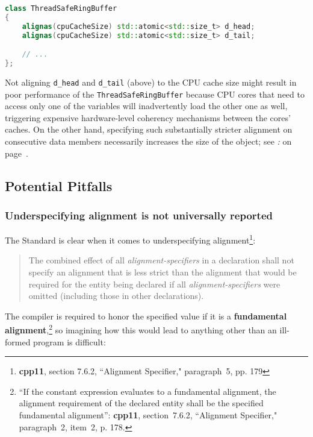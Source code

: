 \begin{lstlisting}[language=C++]
class ThreadSafeRingBuffer
{
    alignas(cpuCacheSize) std::atomic<std::size_t> d_head;
    alignas(cpuCacheSize) std::atomic<std::size_t> d_tail;

    // ...
};
\end{lstlisting}

\noindent Not aligning \texttt{d\_head} and \texttt{d\_tail} (above) to the CPU
cache size might result in poor performance of the
\texttt{ThreadSafeRingBuffer} because CPU cores that need to access only one
of the variables will inadvertently load the other one as well,
triggering expensive hardware-level coherency mechanisms between the
cores' caches. On the other hand, specifying such substantially stricter
alignment on consecutive data members necessarily increases the size of
the object; see {\it{}:} {\it{}} on page~\pageref{stricter-alignment-might-reduce-cache-utilization}.

\subsection[Potential Pitfalls]{Potential Pitfalls}\label{potential-pitfalls}

\subsubsection[Underspecifying alignment is not universally reported]{Underspecifying alignment is not universally reported}\label{underspecifying-alignment-is-not-universally-reported}

The Standard is clear when it comes to underspecifying
alignment{\cprotect\footnote{\textbf{{cpp11}}, section 7.6.2, ``Alignment Specifier," paragraph~5, pp. 179}}:
\begin{quote}
The combined effect of all \textit{alignment-specifiers} in a declaration
shall not specify an alignment that is less strict than the alignment
that would be required for the entity being declared if all
\textit{alignment-specifiers} were omitted (including those in other
declarations).
\end{quote}
The compiler is required to honor the
specified value if it is a \textbf{fundamental
alignment},{\cprotect\footnote{``If the constant expression evaluates to
a fundamental alignment, the alignment requirement of the declared
entity shall be the specified fundamental alignment'': \textbf{cpp11}, section~7.6.2, ``Alignment Specifier," paragraph~2, item~2, p. 178.}} so
imagining how this would lead to anything other than an ill-formed
program is difficult:

